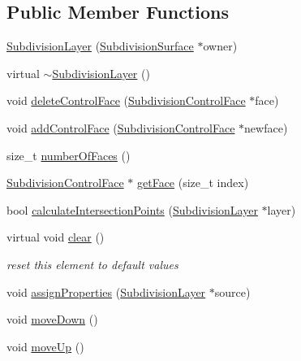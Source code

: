 \subsection*{Public Member Functions}
\begin{DoxyCompactItemize}
\item 
\hyperlink{classShipCAD_1_1SubdivisionLayer_a788864a40265b764b8d97d9a9cbbbd13}{Subdivision\-Layer} (\hyperlink{classShipCAD_1_1SubdivisionSurface}{Subdivision\-Surface} $\ast$owner)
\item 
virtual \hyperlink{classShipCAD_1_1SubdivisionLayer_a4e852a07f46e57f28ffedd4a68c2f4c4}{$\sim$\-Subdivision\-Layer} ()
\item 
void \hyperlink{classShipCAD_1_1SubdivisionLayer_a45b3af65b8b11dd2bf566a454bc125bd}{delete\-Control\-Face} (\hyperlink{classShipCAD_1_1SubdivisionControlFace}{Subdivision\-Control\-Face} $\ast$face)
\item 
void \hyperlink{classShipCAD_1_1SubdivisionLayer_a3c966ebc7e2c1f516f2329324d5658e2}{add\-Control\-Face} (\hyperlink{classShipCAD_1_1SubdivisionControlFace}{Subdivision\-Control\-Face} $\ast$newface)
\item 
size\-\_\-t \hyperlink{classShipCAD_1_1SubdivisionLayer_a75dcc3a9944f799c72d1a87b93d92d89}{number\-Of\-Faces} ()
\item 
\hyperlink{classShipCAD_1_1SubdivisionControlFace}{Subdivision\-Control\-Face} $\ast$ \hyperlink{classShipCAD_1_1SubdivisionLayer_a2e1538a000268fe5f56bf2bea4973c23}{get\-Face} (size\-\_\-t index)
\item 
bool \hyperlink{classShipCAD_1_1SubdivisionLayer_ab2d11ebf60ad6edd818eb0c42971946c}{calculate\-Intersection\-Points} (\hyperlink{classShipCAD_1_1SubdivisionLayer}{Subdivision\-Layer} $\ast$layer)
\item 
virtual void \hyperlink{classShipCAD_1_1SubdivisionLayer_a7046d17ba87dd5ce7399f22ae327fc6e}{clear} ()
\begin{DoxyCompactList}\small\item\em reset this element to default values \end{DoxyCompactList}\item 
void \hyperlink{classShipCAD_1_1SubdivisionLayer_a319ae070f596e92307671cda0a607887}{assign\-Properties} (\hyperlink{classShipCAD_1_1SubdivisionLayer}{Subdivision\-Layer} $\ast$source)
\item 
void \hyperlink{classShipCAD_1_1SubdivisionLayer_a949c536d7c238f8ba3a33abdde8bfaa3}{move\-Down} ()
\item 
void \hyperlink{classShipCAD_1_1SubdivisionLayer_aef4dff844415352660f8cf90120b240c}{move\-Up} ()

\end{DoxyCompactItemize}
